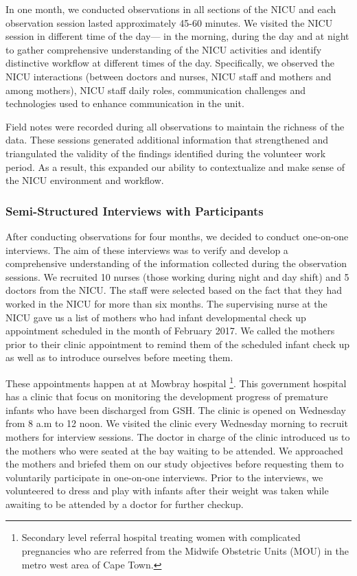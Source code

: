 In one month, we conducted observations in all sections of the NICU and each observation session lasted approximately 45-60 minutes. We visited the NICU session in different time of the day--- in the morning, during the day and at night to gather comprehensive understanding of the NICU activities and identify distinctive workflow at different times of the day. Specifically, we observed the NICU interactions (between doctors and nurses, NICU staff and mothers and among mothers), NICU staff daily roles, communication challenges and technologies used to enhance communication in the unit. 

Field notes were recorded during all observations to maintain the richness of the data. These sessions generated additional information that strengthened and triangulated the validity of the findings identified during the volunteer work period. As a result, this expanded our ability to contextualize and make sense of the NICU environment and workflow. 

\subsubsection{Semi-Structured Interviews with Participants}
After conducting observations for four months, we decided to conduct one-on-one interviews. The aim of these interviews was to verify and develop a comprehensive understanding of the information collected during the observation sessions.  We recruited 10 nurses (those working during night and day shift) and 5 doctors from the NICU. The staff were selected based on the fact that they had worked in the NICU for more than six months. The supervising nurse at the NICU gave us a list of mothers who had infant developmental check up appointment scheduled in the month of February 2017. We called the mothers prior to their clinic appointment to remind them of the scheduled infant check up as well as to introduce ourselves before meeting them. 

These  appointments happen at at Mowbray hospital \footnote{Secondary level referral hospital treating women with complicated pregnancies who are referred from the Midwife Obstetric Units (MOU) in  the metro west area of Cape Town.}. This government hospital has a clinic that focus on monitoring the development progress of premature infants who have been discharged from GSH. The clinic is opened on Wednesday from 8 a.m to 12 noon. We visited the clinic every Wednesday morning to recruit mothers for interview sessions. The doctor in charge of the clinic introduced us to the mothers who were seated at the bay waiting to be attended. We approached the mothers and briefed them on our study objectives before requesting them to voluntarily participate in one-on-one interviews. Prior to the interviews, we volunteered to dress and play with infants after their weight was taken while awaiting to be attended by a doctor for further checkup. 


